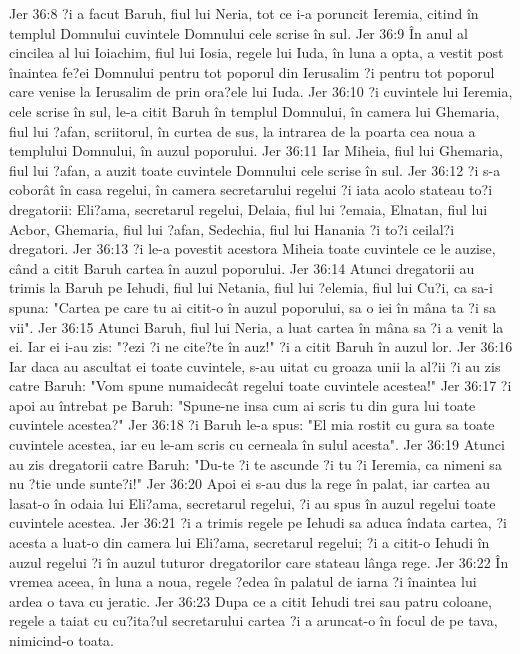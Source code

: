 Jer 36:8  ?i a facut Baruh, fiul lui Neria, tot ce i-a poruncit Ieremia, citind în templul Domnului cuvintele Domnului cele scrise în sul.
Jer 36:9  În anul al cincilea al lui Ioiachim, fiul lui Iosia, regele lui Iuda, în luna a opta, a vestit post înaintea fe?ei Domnului pentru tot poporul din Ierusalim ?i pentru tot poporul care venise la Ierusalim de prin ora?ele lui Iuda.
Jer 36:10  ?i cuvintele lui Ieremia, cele scrise în sul, le-a citit Baruh în templul Domnului, în camera lui Ghemaria, fiul lui ?afan, scriitorul, în curtea de sus, la intrarea de la poarta cea noua a templului Domnului, în auzul poporului.
Jer 36:11  Iar Miheia, fiul lui Ghemaria, fiul lui ?afan, a auzit toate cuvintele Domnului cele scrise în sul.
Jer 36:12  ?i s-a coborât în casa regelui, în camera secretarului regelui ?i iata acolo stateau to?i dregatorii: Eli?ama, secretarul regelui, Delaia, fiul lui ?emaia, Elnatan, fiul lui Acbor, Ghemaria, fiul lui ?afan, Sedechia, fiul lui Hanania ?i to?i ceilal?i dregatori.
Jer 36:13  ?i le-a povestit acestora Miheia toate cuvintele ce le auzise, când a citit Baruh cartea în auzul poporului.
Jer 36:14  Atunci dregatorii au trimis la Baruh pe Iehudi, fiul lui Netania, fiul lui ?elemia, fiul lui Cu?i, ca sa-i spuna: "Cartea pe care tu ai citit-o în auzul poporului, sa o iei în mâna ta ?i sa vii".
Jer 36:15  Atunci Baruh, fiul lui Neria, a luat cartea în mâna sa ?i a venit la ei. Iar ei i-au zis: "?ezi ?i ne cite?te în auz!" ?i a citit Baruh în auzul lor.
Jer 36:16  Iar daca au ascultat ei toate cuvintele, s-au uitat cu groaza unii la al?ii ?i au zis catre Baruh: "Vom spune numaidecât regelui toate cuvintele acestea!"
Jer 36:17  ?i apoi au întrebat pe Baruh: "Spune-ne insa cum ai scris tu din gura lui toate cuvintele acestea?"
Jer 36:18  ?i Baruh le-a spus: "El mia rostit cu gura sa toate cuvintele acestea, iar eu le-am scris cu cerneala în sulul acesta".
Jer 36:19  Atunci au zis dregatorii catre Baruh: "Du-te ?i te ascunde ?i tu ?i Ieremia, ca nimeni sa nu ?tie unde sunte?i!"
Jer 36:20  Apoi ei s-au dus la rege în palat, iar cartea au lasat-o în odaia lui Eli?ama, secretarul regelui, ?i au spus în auzul regelui toate cuvintele acestea.
Jer 36:21  ?i a trimis regele pe Iehudi sa aduca îndata cartea, ?i acesta a luat-o din camera lui Eli?ama, secretarul regelui; ?i a citit-o Iehudi în auzul regelui ?i în auzul tuturor dregatorilor care stateau lânga rege.
Jer 36:22  În vremea aceea, în luna a noua, regele ?edea în palatul de iarna ?i înaintea lui ardea o tava cu jeratic.
Jer 36:23  Dupa ce a citit Iehudi trei sau patru coloane, regele a taiat cu cu?ita?ul secretarului cartea ?i a aruncat-o în focul de pe tava, nimicind-o toata.
